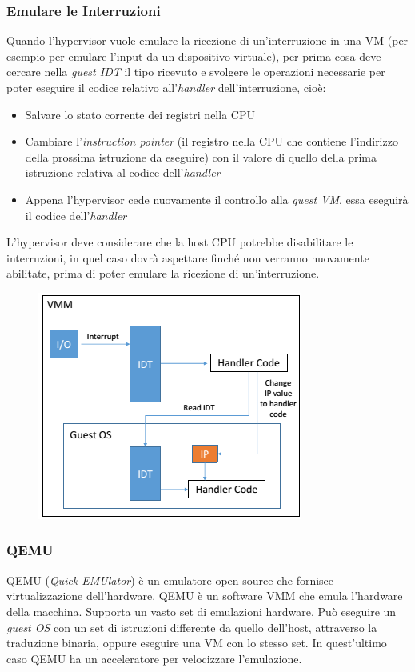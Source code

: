 \documentclass{article}
\begin{document}
\subsubsection{Emulare le Interruzioni}
Quando l’hypervisor vuole emulare la ricezione di un’interruzione in una VM (per esempio per emulare l’input da un dispositivo virtuale), per prima cosa deve cercare nella \textit{guest IDT} il tipo ricevuto e svolgere le operazioni necessarie per poter eseguire il codice relativo all’\textit{handler} dell’interruzione, cioè:
\begin{itemize}
    \item{Salvare lo stato corrente dei registri nella CPU}
    \item{Cambiare l’\textit{instruction pointer} (il registro nella CPU che contiene l’indirizzo della prossima istruzione da eseguire) con il valore di quello della prima istruzione relativa al codice dell’\textit{handler}}
    \item{Appena l’hypervisor cede nuovamente il controllo alla \textit{guest VM}, essa eseguirà il codice dell’\textit{handler}}
\end{itemize}
L’hypervisor deve considerare che la host CPU potrebbe disabilitare le interruzioni, in quel caso dovrà aspettare finché non verranno nuovamente abilitate, prima di poter emulare la ricezione di un’interruzione.
\begin{figure}[H]
    \centering
    \includegraphics[scale=0.8]{img/Virt_tech/16.png}   
    \caption{}
\end{figure}\noindent

\subsubsection{QEMU}
QEMU (\textit{Quick EMUlator}) è un emulatore open source che fornisce virtualizzazione dell’hardware.
QEMU è un software VMM che emula l’hardware della macchina.
Supporta un vasto set di emulazioni hardware. Può eseguire un \textit{guest OS} con un set di istruzioni differente da quello dell’host, attraverso la traduzione binaria, oppure eseguire una VM con lo stesso set. In quest’ultimo caso QEMU ha un acceleratore per velocizzare l’emulazione.
\end{document}
